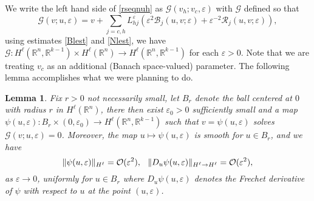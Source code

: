 \documentclass[letterpaper,11pt]{article}
\newcommand{\R}{\mathbb{R}}
\newcommand{\rmO}{\mathcal{O}}
\newcommand{\eps}{\varepsilon}
\newcommand{\B}{\mathcal{B}}
\newcommand{\Rm}{\mathcal{R}}
\newcommand{\G}{\mathcal{G}}
\numberwithin{equation}{section}
\theoremstyle{plain}
\newtheorem{lemma}[theorem]{Lemma}
\theoremstyle{remark}
\begin{document}
We write the left hand side of \eqref{rseqnuh} as $\G(v_h; v_c,\eps)$ with $\G$ defined so that
\[
\G(v;u,\eps) = v+ \sum_{j=c,h} L_{hj}^{\eps}\left( \eps^2\B_j(u,v;\eps)+\eps^{-2}\Rm_j(u,v;\eps) \right), 
\]
using estimates \eqref{Blest} and \eqref{Nlest}, we have $\G : H^\ell(\R^n,\R^{k-1}) \times H^\ell(\R^n) \to H^\ell(\R^n,\R^{k-1})$ for each $\eps >0$.
Note that we are treating $v_c$ as an additional (Banach space-valued) parameter. The following lemma accomplishes what we were planning to do.
\begin{lemma}\label{Lemuh} Fix $r>0$ not necessarily small, let $B_r$ denote the ball centered at $0$ with radius $r$ in $H^\ell(\R^n)$, there then exist $\eps_0>0$ sufficiently small and a map $\psi(u,\eps): B_r \times (0,\eps_0) \to H^\ell(\R^n,\R^{k-1})$ such that $v = \psi(u, \eps)$ solves $\G(v;u,\eps) = 0$. Moreover, the map $u \mapsto \psi(u,\eps)$ is smooth for $u\in B_r$, and we have 
\[
\|\psi(u,\eps)\|_{H^\ell} = \rmO(\eps^2), \hspace{0.1in}\|D_u\psi(u,\eps)\|_{H^\ell \to H^\ell} = \rmO(\eps^2),
\] as 
$\eps \to 0$, uniformly for $u\in B_r$ where $D_u\psi(u,\eps)$ denotes the Frechet derivative of $\psi$ with respect to $u$ at the point $(u,\eps)$.  \end{lemma}
\end{document}
